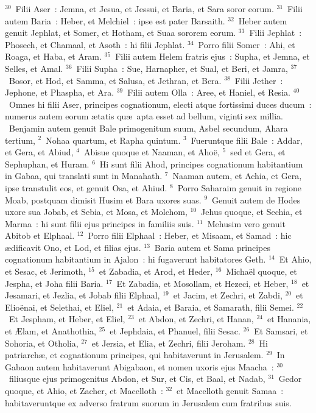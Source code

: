${}^{30}$~Filii Aser~: Jemna, et Jesua, et Jessui, et Baria, et Sara soror eorum.
${}^{31}$~Filii autem Baria~: Heber, et Melchiel~: ipse est pater Barsaith.
${}^{32}$~Heber autem genuit Jephlat, et Somer, et Hotham, et Suaa sororem eorum.
${}^{33}$~Filii Jephlat~: Phosech, et Chamaal, et Asoth~: hi filii Jephlat.
${}^{34}$~Porro filii Somer~: Ahi, et Roaga, et Haba, et Aram.
${}^{35}$~Filii autem Helem fratris ejus~: Supha, et Jemna, et Selles, et Amal.
${}^{36}$~Filii Supha~: Sue, Harnapher, et Sual, et Beri, et Jamra,
${}^{37}$~Bosor, et Hod, et Samma, et Salusa, et Jethran, et Bera.
${}^{38}$~Filii Jether~: Jephone, et Phaspha, et Ara.
${}^{39}$~Filii autem Olla~: Aree, et Haniel, et Resia.
${}^{40}$~Omnes hi filii Aser, principes cognationum, electi atque fortissimi duces ducum~: numerus autem eorum \ae tatis qu\ae\ apta esset ad bellum, viginti sex millia.
~\lettrine[lines=10,image=true,loversize=0.05,lraise=-0.03]{B}{}enjamin autem genuit Bale primogenitum suum, Asbel secundum, Ahara tertium,
${}^{2}$~Nohaa quartum, et Rapha quintum.
${}^{3}$~Fueruntque filii Bale~: Addar, et Gera, et Abiud,
${}^{4}$~Abisue quoque et Naaman, et Aho\"e,
${}^{5}$~sed et Gera, et Sephuphan, et Huram.
${}^{6}$~Hi sunt filii Ahod, principes cognationum habitantium in Gabaa, qui translati sunt in Manahath.
${}^{7}$~Naaman autem, et Achia, et Gera, ipse transtulit eos, et genuit Osa, et Ahiud.
${}^{8}$~Porro Saharaim genuit in regione Moab, postquam dimisit Husim et Bara uxores suas.
${}^{9}$~Genuit autem de Hodes uxore sua Jobab, et Sebia, et Mosa, et Molchom,
${}^{10}$~Jehus quoque, et Sechia, et Marma~: hi sunt filii ejus principes in familiis suis.
${}^{11}$~Mehusim vero genuit Abitob et Elphaal.
${}^{12}$~Porro filii Elphaal~: Heber, et Misaam, et Samad~: hic \ae dificavit Ono, et Lod, et filias ejus.
${}^{13}$~Baria autem et Sama principes cognationum habitantium in Ajalon~: hi fugaverunt habitatores Geth.
${}^{14}$~Et Ahio, et Sesac, et Jerimoth,
${}^{15}$~et Zabadia, et Arod, et Heder,
${}^{16}$~Micha\"el quoque, et Jespha, et Joha filii Baria.
${}^{17}$~Et Zabadia, et Mosollam, et Hezeci, et Heber,
${}^{18}$~et Jesamari, et Jezlia, et Jobab filii Elphaal,
${}^{19}$~et Jacim, et Zechri, et Zabdi,
${}^{20}$~et Elio\"enai, et Selethai, et Eliel,
${}^{21}$~et Adaia, et Baraia, et Samarath, filii Semei.
${}^{22}$~Et Jespham, et Heber, et Eliel,
${}^{23}$~et Abdon, et Zechri, et Hanan,
${}^{24}$~et Hanania, et \AE lam, et Anathothia,
${}^{25}$~et Jephdaia, et Phanuel, filii Sesac.
${}^{26}$~Et Samsari, et Sohoria, et Otholia,
${}^{27}$~et Jersia, et Elia, et Zechri, filii Jeroham.
${}^{28}$~Hi patriarch\ae , et cognationum principes, qui habitaverunt in Jerusalem.
${}^{29}$~In Gabaon autem habitaverunt Abigabaon, et nomen uxoris ejus Maacha~:
${}^{30}$~filiusque ejus primogenitus Abdon, et Sur, et Cis, et Baal, et Nadab,
${}^{31}$~Gedor quoque, et Ahio, et Zacher, et Macelloth~:
${}^{32}$~et Macelloth genuit Samaa~: habitaveruntque ex adverso fratrum suorum in Jerusalem cum fratribus suis.


